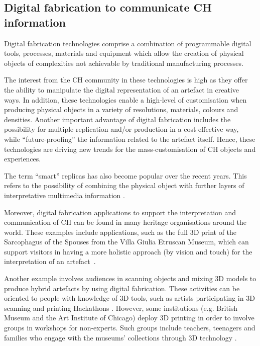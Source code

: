\documentclass[acmlarge,screen,dvipsnames]{acmart}
\begin{document}
\subsection{Digital fabrication to communicate CH information}

Digital fabrication technologies comprise a combination of
programmable digital tools, processes, materials and equipment which
allow the creation of physical objects of complexities not achievable
by traditional manufacturing processes.

The interest from the CH community in these technologies is high as
they offer the ability to manipulate the digital representation of an
artefact in creative ways. In addition, these technologies enable a
high-level of customisation when producing physical objects in a
variety of resolutions, materials, colours and densities. Another
important advantage of digital fabrication includes the possibility
for multiple replication and/or production in a cost-effective way,
while ``future-proofing'' the information related to the artefact
itself. Hence, these technologies are driving new trends for the
mass-customisation of CH objects and experiences.

The term ``smart'' replicas has also become popular over the recent
years. This refers to the possibility of combining the physical object
with further layers of interpretative multimedia information
\cite{Capurro2015,Marshall2016}.

Moreover, digital fabrication applications to support the
interpretation and communication of CH can be found in many heritage
organisations around the world. These examples include applications,
such as the full 3D print of the Sarcophagus of the Spouses from the
Villa Giulia Etruscan Museum, which can support visitors in having a
more holistic approach (by vision and touch) for the interpretation of
an artefact~\cite{Guidazzoli2014}.

Another example involves audiences in scanning objects and mixing 3D
models to produce hybrid artefacts by using digital fabrication. These
activities can be oriented to people with knowledge of 3D tools, such
as artists participating in 3D scanning and printing Hackathons
\cite{Mullaney2012,Neely2013}. However, some institutions
(e.g. British Museum and the Art Institute of Chicago) deploy 3D
printing in order to involve groups in workshops for non-experts. Such
groups include teachers, teenagers and families who engage with the
museums' collections through 3D technology
\cite{BritishMuseum2016,Neely2015,Miles2015}.
\end{document}
